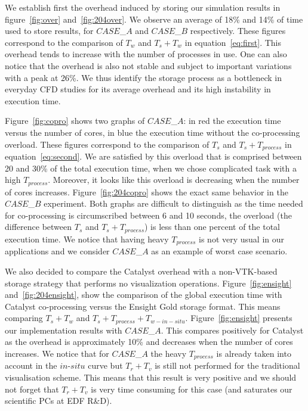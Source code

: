We establish first the overhead induced by storing our simulation results in
figure~\ref{fig:over} and~\ref{fig:204over}. We observe an average of 18\% and
14\% of time used to store results, for $CASE$\_$A$ and $CASE$\_$B$
respectively. These figures correspond to the comparison of $T_w$ and $T_s +
T_w$ in equation~\ref{eq:first}. 
This overhead tends to increase with the number of processes in
use. One can also notice that the overhead is also not stable and subject 
to important variations with a peak at
26\%. We thus identify the storage process as a bottleneck in everyday CFD
studies for its average overhead and its high instability in execution time.

Figure~\ref{fig:copro} shows two graphs of $CASE$\_$A$: in red the execution 
time versus the number of cores, in blue the execution time without
the co-processing overload. These figures correspond to the comparison of $T_s$
and $T_s + T_{process}$ in equation~\ref{eq:second}.
We are satisfied by this overload that is comprised between 20 and 30\% of the total execution time, 
when we chose complicated task with a high $T_{process}$.
Moreover, it looks like this overload is decreasing when the number of cores increases. 
Figure~\ref{fig:204copro} shows the exact same behavior in the $CASE$\_$B$ experiment. Both
graphs are difficult to distinguish as the time needed for co-processing is
circumscribed between 6 and 10 seconds, the overload (the difference between $T_s$ and $T_s + T_{process}$) is less than one
percent of the total execution time. We notice that having heavy $T_{process}$ is not very usual in our applications and 
we consider $CASE$\_$A$ as an example of worst case scenario.

We also decided to compare the Catalyst overhead with a non-VTK-based 
storage strategy that performs no visualization operations. Figure~\ref{fig:ensight} and~\ref{fig:204ensight}, 
show the comparison of the global execution time with Catalyst co-processing
versus the Ensight Gold storage format. This means comparing $T_s + T_w$ 
and $T_s + T_{process} + T_{w-in-situ}$. Figure~\ref{fig:ensight} presents
our implementation results with $CASE$\_$A$. This compares positively for Catalyst as the overhead
is approximately 10\% and decreases when the number of cores increases. We
notice that for $CASE$\_$A$ the heavy $T_{process}$ is already taken into
account in the $in$-$situ$ curve but $T_r + T_v$ is still not performed for the
traditional visualisation scheme. This means that this result is very positive
and we should not forget that $T_r + T_v$ is very time consuming for this case
(and saturates our scientific PCs at EDF R\&D). 

